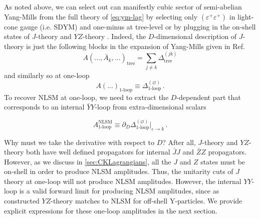 \documentclass[11pt,letter]{article}
\begin{document}
As noted above, we can select out can manifestly cubic
sector of semi-abelian Yang-Mills from the full theory of \cref{eq:ym-lag} by selecting only $(\varepsilon^+\varepsilon^+)$ in light-cone gauge (i.e. SDYM) and one-minus at tree-level or by plugging in the on-shell states of $J$-theory \cite{Cheung:2020djz,Cheung:2021zvb} and
$YZ$-theory \cite{Cheung:2016prv}. Indeed, the
$D$-dimensional description of $J$-theory is just the following blocks
in the expansion of Yang-Mills given in Ref.~\cite{Pavao:2022kog}
\begin{equation}
A(...,\bar{A}_k,...)_{\text{tree}} = \sum_{j\neq k}\Delta^{(jk)}_{\text{tree}}
\end{equation}
and similarly so at one-loop
\begin{equation}
A(...)_{\text{1-loop}} \equiv \Delta^{(\varnothing)}_{\text{1-loop}}\, .
\end{equation}
To recover NLSM at one-loop, we need to extract the $D$-dependent part
that corresponds to an internal $\bar{Y}Y$-loop from extra-dimensional
scalars
\begin{eBox}
\begin{equation}
A^{\text{NLSM}}_{\text{1-loop}} \equiv \partial_D \Delta^{(\varnothing)}_{\text{1-loop}}\big|_{\varepsilon\rightarrow k}\, .
\end{equation}
\end{eBox}
Why must we take the derivative with respect to $D$? After all,
$J$-theory and $YZ$-theory both have well defined propagators for
internal $\bar{J}J$ and $\bar{Z}Z$ propagators. However, as we discuss
in \cref{sec:CKLagrangians}, all the $J$ and $Z$ states must be on-shell in order to
produce NLSM amplitudes. Thus, the unitarity cuts of $J$ theory at
one-loop will not produce NLSM amplitudes. However, the internal
$YY$-loop is a valid forward limit for producing NLSM amplitudes,
since as constructed $YZ$-theory matches to NLSM for off-shell
Y-particles. We provide explicit expressions for these one-loop amplitudes in the next section.
\end{document}

